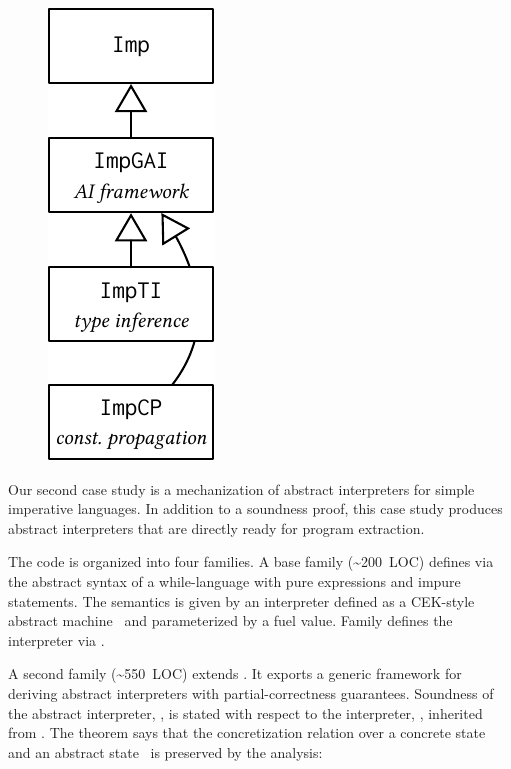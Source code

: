 
\begin{figure}
\includegraphics[scale=.66]{graphics/ai-casestudy.pdf}
\end{figure}

Our second case study is a mechanization of abstract interpreters
for simple imperative languages.
In addition to a soundness proof, this case study produces abstract
interpreters that are directly ready for program extraction.

The code is organized into four families.
A base family  (\textasciitilde 200~LOC) defines via  the abstract
syntax of a while-language with pure expressions and impure statements.
The semantics is given by an interpreter defined as a CEK-style abstract
machine~\cite{felleisen1986control} and parameterized by a fuel value.
Family  defines the interpreter via .

A second family  (\textasciitilde 550~LOC) extends .
It exports a generic framework for deriving
abstract interpreters with partial-correctness guarantees.
Soundness of the abstract interpreter, ,
is stated with respect to the interpreter, , inherited from .
The theorem says that the concretization relation  over a
concrete state~ and an abstract state~ is preserved
by the analysis:

